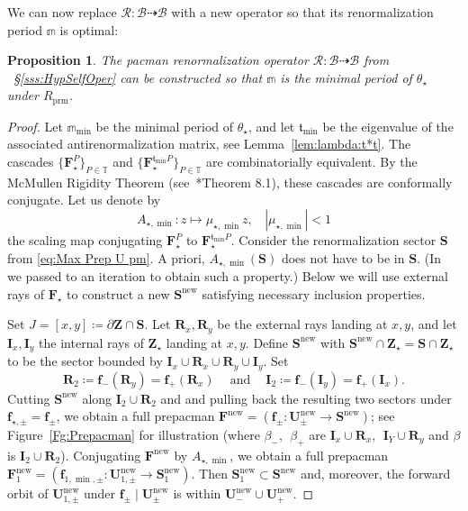 \documentclass{amsart}
\renewcommand{\sp}{{\ \ }}
\newcommand{\1}{{\mathbb 1 }}
\newcommand\PT{\mathbb{ T}}
\newcommand\RR{\mathcal{R}}
\newcommand\prm{{\operatorname{prm}}}
\newcommand\cRRc{R_{\prm}}%
\newcommand{\bF}{{\mathbf F}}
\newcommand{\bZ}{{\mathbf Z}}
\newcommand{\bR}{{\mathbf R}}
\newcommand{\bS}{{\mathbf S}}
\newcommand{\bU}{{\mathbf U}}
\newcommand{\bI}{{\mathbf I}}
\newcommand{\bbf}{{\mathbf f}}
\newcommand{\str}{{\star}}
\newcommand{\mm}{\mathbb{m}}
\renewcommand{\tt}{\mathfrak{t}}
\newcommand\BB{\mathcal{B}}
\newcommand\new{{\operatorname{new}}}
\newtheorem{prop}[thm]{Proposition}
\theoremstyle{remark}
\numberwithin{equation}{section}
\theoremstyle{definition}
\theoremstyle{nonumberbreak}
\begin{document}
We can now replace $\RR\colon \BB\dashrightarrow \BB$ with a new operator so that its renormalization period $\mm$ is optimal: 
\begin{prop}
\label{prop:Ren oper with min per}
The pacman renormalization operator $\RR\colon \BB\dashrightarrow \BB$ from ~\S\ref{sss:HypSelfOper} can be constructed so that $\mm$ is the minimal period of $\theta_\str$ under $\cRRc$.
\end{prop}
\begin{proof} 
Let $\mm_{\min}$ be the minimal period of $\theta_\str$, and let $\tt_{\min}$ be the eigenvalue of the associated antirenormalization matrix, see Lemma~\ref{lem:lambda:t*t}. The cascades $\{ \bF_\str^P\}_{P\in \PT}$ and $\{\bF_\str^{\tt_{\min} P}\}_{P\in \PT}$ are combinatorially equivalent. By the McMullen Rigidity Theorem (see~\cite{McM2}*{Theorem 8.1}), these cascades are conformally conjugate. Let us denote by \[A_{\str,\min}\colon z\mapsto \mu_{\str,\min} z,\sp\sp |\mu_{\str,\min}|<1\] the scaling map conjugating $\bF_\str^P$ to $\bF_\str^{\tt_{\min} P}$. Consider the renormalization sector $\bS$ from \eqref{eq:Max Prep U pm}. A priori, $A_{\str,\min}(\bS)$ does not have to be in $\bS$. (In~\cite{DLS} we passed to an iteration to obtain such a property.) Below we will use external rays of $\bF_\str$ to construct a new $\bS^\new$ satisfying necessary inclusion properties.

Set $J=[x,y]\coloneqq \partial \bZ\cap \bS$. Let $\bR_x,\bR_y$ be the external rays landing at $x,y$, and let $\bI_x,\bI_y$ the internal rays of $\bZ_\str$ landing at $x,y$. Define $\bS^\new$ with $\bS^\new\cap \bZ_\str=\bS\cap \bZ_\str$ to be the sector bounded by $\bI_x\cup \bR_x\cup \bR_y\cup \bI_y$. Set \[\bR_2\coloneqq \bbf_-(\bR_y)=\bbf_+(\bR_x)\sp\sp\text{ and }\sp\sp \bI_2\coloneqq \bbf_-(\bI_y)=\bbf_+(\bI_x).\]
Cutting $\bS^\new$ along $\bI_2\cup \bR_2$ and and pulling back the resulting two sectors under $\bbf_{\str,\pm}=\bbf_{\pm}$, we obtain a full prepacman $\bF^\new= (\bbf_{\pm}\colon \bU^\new_{\pm }\to \bS^\new)$; see Figure~\ref{Fg:Prepacman} for illustration (where $\beta_-,\sp \beta_+$ are $\bI_x\cup \bR_x,\sp \bI_Y\cup \bR_y$ and $\beta$ is $\bI_2\cup \bR_2$). Conjugating $\bF^\new$ by $A_{\str,\min}$, we obtain a full prepacman $\bF_1^\new=(\bbf_{1,\min,\pm}\colon \bU^\new_{1,\pm }\to \bS_1^\new)$. Then $\bS_1^\new\subset \bS^\new$ and, moreover, the forward orbit of $\bU^\new_{1,\pm }$ under $\bbf_{\pm}\mid \bU^\new_{\pm }$ is within $\bU^\new_{-}\cup \bU^\new_{+}$.


\end{proof}
\end{document}
